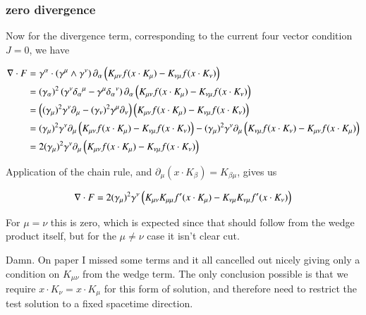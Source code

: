 \documentclass{article}
\begin{document}
\subsubsection{ zero divergence }

Now for the divergence term, corresponding to the current four vector condition $J = 0$, we have

\begin{align*}
\nabla \cdot F 
&= \gamma^\alpha \cdot
\left(\gamma^\mu \wedge \gamma^\nu\right) \partial_\alpha \left( K_{\mu\nu} f( x \cdot K_\mu ) -K_{\nu\mu} f( x \cdot K_\nu ) \right) \\
&= 
(\gamma_\alpha)^2 
\left( \gamma^\nu {\delta_\alpha}^\mu -\gamma^\mu {\delta_\alpha}^\nu \right)
\partial_\alpha \left( K_{\mu\nu} f( x \cdot K_\mu ) -K_{\nu\mu} f( x \cdot K_\nu ) \right) \\
&= 
\left(
(\gamma_\mu)^2 \gamma^\nu \partial_\mu 
-(\gamma_\nu)^2 \gamma^\mu \partial_\nu 
\right)
\left( K_{\mu\nu} f( x \cdot K_\mu ) -K_{\nu\mu} f( x \cdot K_\nu ) \right) \\
&= 
(\gamma_\mu)^2 \gamma^\nu \partial_\mu \left( K_{\mu\nu} f( x \cdot K_\mu ) -K_{\nu\mu} f( x \cdot K_\nu ) \right) 
-(\gamma_\mu)^2 \gamma^\nu \partial_\mu \left( K_{\nu\mu} f( x \cdot K_\nu ) -K_{\mu\nu} f( x \cdot K_\mu ) \right) \\
&= 2 (\gamma_\mu)^2 \gamma^\nu \partial_\mu \left( K_{\mu\nu} f( x \cdot K_\mu ) -K_{\nu\mu} f( x \cdot K_\nu ) \right) \\
\end{align*}

Application of the chain rule, and $\partial_\mu ( x \cdot K_\beta ) = K_{\beta\mu}$, gives us

\begin{align*}
\nabla \cdot F 
&= 2 (\gamma_\mu)^2 \gamma^\nu \left( K_{\mu\nu} K_{\mu\mu} f'( x \cdot K_\mu ) -K_{\nu\mu} K_{\nu\mu} f'( x \cdot K_\nu ) \right) \\
\end{align*}

For $\mu = \nu$ this is zero, which is expected since that should follow from the wedge product itself, but for the $\mu \ne \nu$
case it isn't clear cut.

Damn.  On paper I missed some terms and it all cancelled out nicely giving only a condition on $K_{\mu\nu}$ from the wedge term.  The only
conclusion possible is that we require $x \cdot K_\nu = x \cdot K_\mu$ for this form of solution, and therefore need to restrict the
test solution to a fixed spacetime direction.
\end{document}
